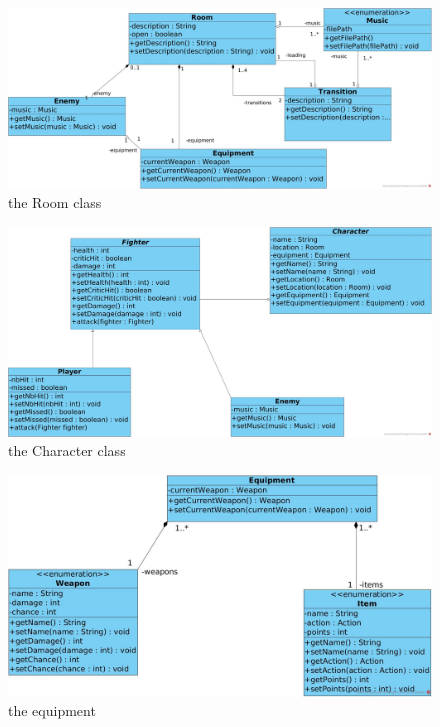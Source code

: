 \documentclass[11pt]{extarticle}
\begin{document}
\begin{figure}
    \caption{the Room class}
    \label{roomClass}
    \includegraphics[scale = 0.15]{room}
\end{figure}

\begin{figure}
    \centering
    
    \caption{the Character class}
    \label{characterClass}
    \includegraphics[scale = 0.15]{character}
\end{figure}

\begin{figure}
    \centering
    
    \caption{the equipment}
    \label{equipmentClass}
    \includegraphics[scale = 0.24]{equipment}
\end{figure}
\end{document}
